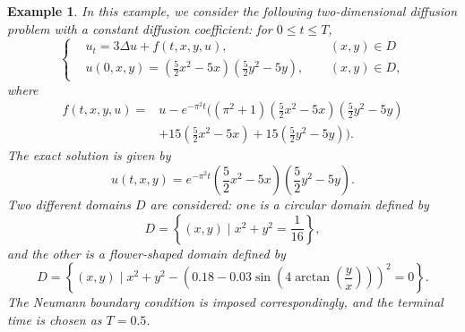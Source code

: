 \documentclass[3p,times]{elsarticle}
\newtheorem{example}{Example}[section]
\numberwithin{equation}{section}
\begin{document}
\begin{example}
	\label{ex1}
	In this example, we consider the following two-dimensional diffusion problem with a constant diffusion coefficient: for $0 \leq t \leq T$, 
	\begin{equation}
		\left\{\begin{split}
			&u_t=3\Delta u +f(t, x, y, u), \ &&(x,y)\in D\\
			&u(0,x,y) = \left(\frac 5 2 x^2-5x\right)\left(\frac 5 2 y^2-5y \right), \ \  &&(x, y) \in D,
		\end{split}
		\right.
	\end{equation}
	where
	\begin{equation*}
		\begin{split}
			f(t, x, y, u) =& u-e^{-\pi^2 t}\Bigg((\pi^2+1)\left(\frac 5 2x^2-5x\right)\left(\frac 5 2 y^2-5y\right)\\
			&+15\left(\frac 5 2 x^2-5x\right)+15\left(\frac 5 2y^2-5y\right) \Bigg).
		\end{split}
	\end{equation*}
	The exact solution is given by $$u(t,x,y)=e^{-\pi^2 t}\left(\frac 5 2x^2-5x \right)\left(\frac 5 2y^2-5y \right).$$
	Two different domains $D$ are considered: one is a circular domain defined by
	\begin{equation}
		\label{circle}
		D=\left\{(x,y)\;\big|\; x^2+y^2=\frac{1}{16} \right\},
	\end{equation}
	and the other is a flower-shaped domain defined by
	\begin{equation}
		\label{flower}
		D=\left\{(x,y)\;\big|\; x^2+y^2-\left(0.18-0.03\sin\left(4\arctan\left(\frac y x\right)\right)\right)^2=0 \right\}.
	\end{equation}
	The Neumann boundary condition is imposed correspondingly, and 
	the terminal time is chosen as $T=0.5$. 
\end{example}
\end{document}
